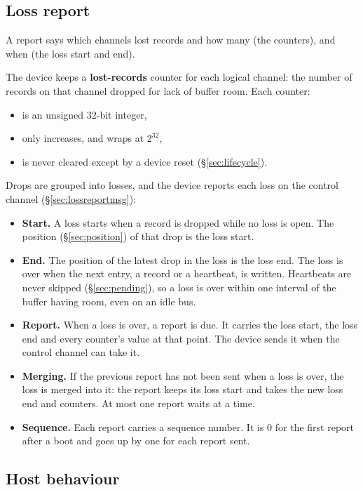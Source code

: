 \documentclass[11pt,a4paper]{article}
\newcommand{\sref}[1]{\S\ref{#1}}
\begin{document}
\subsection{Loss report}\label{sec:lossreport}

A report says which channels lost records and how many (the counters), and when (the
loss start and end).

The device keeps a \textbf{lost-records} counter for each logical channel: the number
of records on that channel dropped for lack of buffer room. Each counter:
\begin{itemize}
  \item is an unsigned 32-bit integer,
  \item only increases, and wraps at $2^{32}$,
  \item is never cleared except by a device reset (\sref{sec:lifecycle}).
\end{itemize}

Drops are grouped into losses, and the device reports each loss on the control channel
(\sref{sec:lossreportmsg}):
\begin{itemize}
  \item \textbf{Start.} A loss starts when a record is dropped while no loss is open.
        The position (\sref{sec:position}) of that drop is the loss start.
  \item \textbf{End.} The position of the latest drop in the loss is the loss end. The
        loss is over when the next entry, a record or a heartbeat, is written.
        Heartbeats are never skipped (\sref{sec:pending}), so a loss is over within
        one interval of the buffer having room, even on an idle bus.
  \item \textbf{Report.} When a loss is over, a report is due. It carries the loss
        start, the loss end and every counter's value at that point. The device sends
        it when the control channel can take it.
  \item \textbf{Merging.} If the previous report has not been sent when a loss is
        over, the loss is merged into it: the report keeps its loss start and takes
        the new loss end and counters. At most one report waits at a time.
  \item \textbf{Sequence.} Each report carries a sequence number. It is 0 for the
        first report after a boot and goes up by one for each report sent.
\end{itemize}

\subsection{Host behaviour}\label{sec:hostbehaviour}
\end{document}
